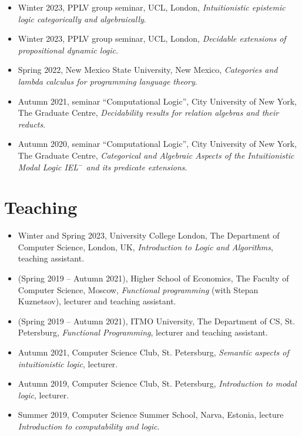 \documentclass[10pt,a4paper]{article}
\begin{document}
\begin{itemize}[leftmargin=*]
    \item Winter 2023, PPLV group seminar, UCL, London, \textit{Intuitionistic epistemic logic categorically and algebraically}.
    \item Winter 2023, PPLV group seminar, UCL, London, \textit{Decidable extensions of propositional dynamic logic}.
    \item Spring 2022, New Mexico State University, New Mexico, \textit{Categories and lambda calculus for programming language theory}.
    \item Autumn 2021, seminar ``Computational Logic'', City University of New York, The Graduate Centre, \textit{Decidability results for relation algebras and their reducts}.
    \item Autumn 2020, seminar ``Computational Logic'', City University of New York, The Graduate Centre, \textit{Categorical and Algebraic Aspects of the Intuitionistic Modal Logic IEL$^-$ and its predicate extensions}.
\end{itemize}


\section{Teaching}

\begin{itemize}[leftmargin=*]
    \item Winter and Spring 2023, University College London, The Department of Computer Science, London, UK, \textit{Introduction to Logic and Algorithms}, teaching assistant.
    \item (Spring 2019 -- Autumn 2021), Higher School of Economics, The Faculty of Computer Science, Moscow, \textit{Functional programming} (with Stepan Kuznetsov), lecturer and teaching assistant.
    \item (Spring 2019 -- Autumn 2021), ITMO University, The Department of CS, St. Petersburg, \textit{Functional Programming}, lecturer and teaching assistant.
    \item Autumn 2021, Computer Science Club, St. Petersburg, \textit{Semantic aspects of intuitionistic logic}, lecturer.
    \item Autumn 2019, Computer Science Club, St. Petersburg, \textit{Introduction to modal logic}, lecturer.
    \item Summer 2019, Computer Science Summer School, Narva, Estonia, lecture \textit{Introduction to computability and logic}.
\end{itemize}
\end{document}
